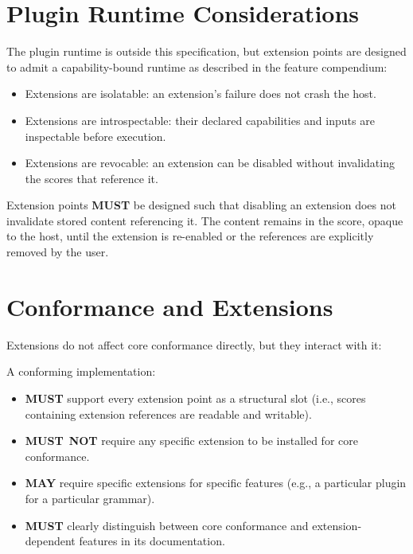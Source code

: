 \documentclass[11pt,letterpaper]{report}
\newcounter{requirement}[chapter]
\newcommand{\MUST}{\textbf{MUST}}
\newcommand{\MUSTNOT}{\textbf{MUST}\nobreak\ \textbf{NOT}}
\newcommand{\MAY}{\textbf{MAY}}
\begin{document}
\section{Plugin Runtime Considerations}
\label{sec:ext:runtime}

The plugin runtime is outside this specification, but extension
points are designed to admit a capability-bound runtime as described
in the feature compendium:

\begin{itemize}
  \item Extensions are isolatable: an extension's failure does not
    crash the host.
  \item Extensions are introspectable: their declared capabilities
    and inputs are inspectable before execution.
  \item Extensions are revocable: an extension can be disabled
    without invalidating the scores that reference it.
\end{itemize}

\begin{requirement}
  \label{req:ext:disabled-extension-preservation}
  Extension points \MUST{} be designed such that disabling an
  extension does not invalidate stored content referencing it. The
  content remains in the score, opaque to the host, until the
  extension is re-enabled or the references are explicitly removed
  by the user.
\end{requirement}

\section{Conformance and Extensions}
\label{sec:ext:conformance}

Extensions do not affect core conformance directly, but they
interact with it:

\begin{requirement}
  \label{req:ext:extension-conformance}
  A conforming implementation:

  \begin{itemize}
    \item \MUST{} support every extension point as a structural
      slot (i.e., scores containing extension references are
      readable and writable).
    \item \MUSTNOT{} require any specific extension to be installed
      for core conformance.
    \item \MAY{} require specific extensions for specific features
      (e.g., a particular plugin for a particular grammar).
    \item \MUST{} clearly distinguish between core conformance and
      extension-dependent features in its documentation.
  \end{itemize}
\end{requirement}
\end{document}
